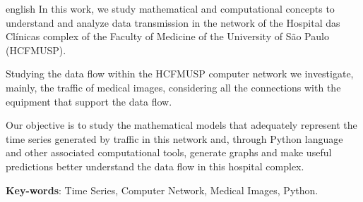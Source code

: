 \documentclass[
	12pt,				%
	openright,			%
	twoside,			%
	a4paper,			%
	english,			%
	french,				%
	spanish,			%
	brazil				%
	]{abntex2}
\begin{document}
\begin{resumo}[Abstract]
 \begin{otherlanguage*}{english}
In this work, we study mathematical and computational concepts to understand and analyze data transmission in the network of the Hospital das Clínicas complex of the Faculty of Medicine of the University of São Paulo (HCFMUSP).

Studying the data flow within the HCFMUSP computer network we investigate, mainly, the traffic of medical images, considering all the connections with the equipment that support the data flow.

Our objective is to study the mathematical models that adequately represent the time series generated by traffic in this network and, through Python language and other associated computational tools, generate graphs and make useful predictions better understand the data flow in this hospital complex.

   \vspace{\onelineskip}
 
   \noindent 
   \textbf{Key-words}: Time Series, Computer Network, Medical Images, Python.
 \end{otherlanguage*}
\end{resumo}



\listoffigures*
\cleardoublepage

\listoftables*
\cleardoublepage
\end{document}
